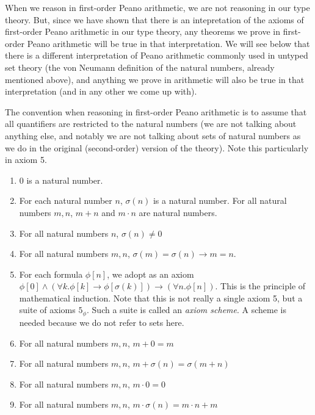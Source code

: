 \documentclass[12pt]{book}
\begin{document}
When we reason in first-order Peano arithmetic, we are not reasoning
in our type theory.  But, since we have shown that there is an
intepretation of the axioms of first-order Peano arithmetic in our
type theory, any theorems we prove in first-order Peano arithmetic
will be true in that interpretation.  We will see below that there is
a different interpretation of Peano arithmetic commonly used in
untyped set theory (the von Neumann definition of the natural numbers,
already mentioned above), and anything we prove in arithmetic will
also be true in that interpretation (and in any other we come up
with).

The convention when reasoning in first-order Peano arithmetic is to
assume that all quantifiers are restricted to the natural numbers (we
are not talking about anything else, and notably we are not talking
about sets of natural numbers as we do in the original (second-order)
version of the theory).  Note this particularly in axiom 5.

\begin{enumerate}

\item $0$ is a natural number.

\item For each natural number $n$, $\sigma(n)$ is a natural number.  For all natural numbers $m, n$, $m+n$ and $m \cdot n$ are natural numbers.

\item For all natural numbers $n$, $\sigma(n) \neq 0$

\item For all natural numbers $m,n$, $\sigma(m)=\sigma(n)\rightarrow m=n$.

\item For each formula $\phi[n]$, we adopt as an axiom $\phi[0] \wedge
(\forall k.\phi[k] \rightarrow \phi[\sigma(k)]) \rightarrow (\forall
n.\phi[n])$.  This is the principle of mathematical induction.  Note
that this is not really a single axiom 5, but a suite of axioms
$5_{\phi}$.  Such a suite is called an {\em axiom scheme\/}.  A scheme
is needed because we do not refer to sets here.

\item For all natural numbers $m,n$, $m+0=m$

\item For all natural numbers $m,n$, $m+\sigma(n)=\sigma(m+n)$

\item For all natural numbers $m,n$, $m\cdot 0 = 0$

\item For all natural numbers $m,n$, $m\cdot \sigma(n) = m\cdot n + m$



\end{enumerate}
\end{document}
